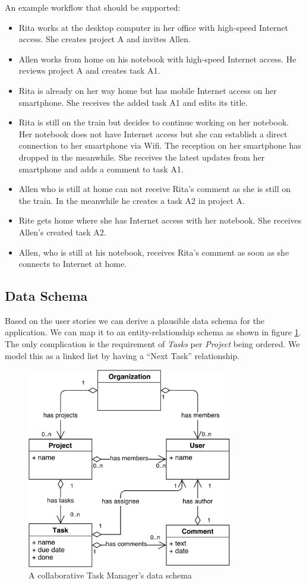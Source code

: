 An example workflow that should be supported:\\

\begin{itemize}
\item Rita works at the desktop computer in her office with high-speed Internet access. She creates project A and invites Allen.
\item Allen works from home on his notebook with high-speed Internet access. He reviews project A and creates task A1.
\item Rita is already on her way home but has mobile Internet access on her smartphone. She receives the added task A1 and edits its title.
\item Rita is still on the train but decides to continue working on her notebook. Her notebook does not have Internet access but she can establish a direct connection to her smartphone via Wifi. The reception on her smartphone has dropped in the meanwhile. She receives the latest updates from her smartphone and adds a comment to task A1.
\item Allen who is still at home can not receive Rita's comment as she is still on the train. In the meanwhile he creates a task A2 in project A.
\item Rite gets home where she has Internet access with her notebook. She receives Allen's created task A2.
\item Allen, who is still at his notebook, receives Rita's comment as soon as she connects to Internet at home.
\end{itemize}

\subsection{Data Schema}
Based on the user stories we can derive a plausible data schema for the application. We can map it to an entity-relationship schema as shown in figure \ref{fig:tasks-data-schema}.\\
The only complication is the requirement of \emph{Tasks} per \emph{Project} being ordered. We model this as a linked list by having a ``Next Task'' relationship.

\begin{figure}[tasks-data-schema]
\centering
\includegraphics[width=0.8\textwidth]{img/tasks-schema}
\caption{A collaborative Task Manager's data schema}
\label{fig:tasks-data-schema}
\end{figure}
